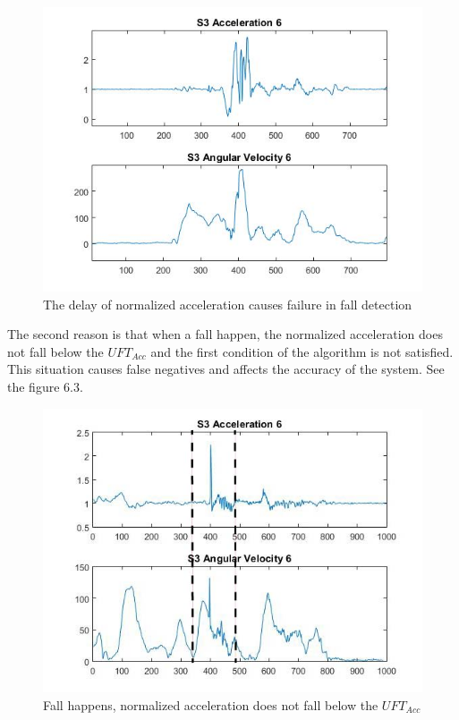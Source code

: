 \documentclass[letterpaper,12pt,titlepage,oneside,final]{book}
\begin{document}
\begin{figure}[h!]
	\centering
	\includegraphics[scale=0.5]{delay_accel}
	\caption{The delay of normalized acceleration causes failure in fall detection}
\end{figure}\par
The second reason is that when a fall happen, the normalized acceleration does not fall below the $UFT_{Acc}$ and the first condition of the algorithm is not satisfied. This situation causes false negatives and affects the accuracy of the system. See the figure 6.3.
\begin{figure}[h!]
	\centering
	\includegraphics[scale=0.5]{no_lower_peak}
	\caption{Fall happens, normalized acceleration does not fall below the $UFT_{Acc}$ }
\end{figure}\par
\end{document}
